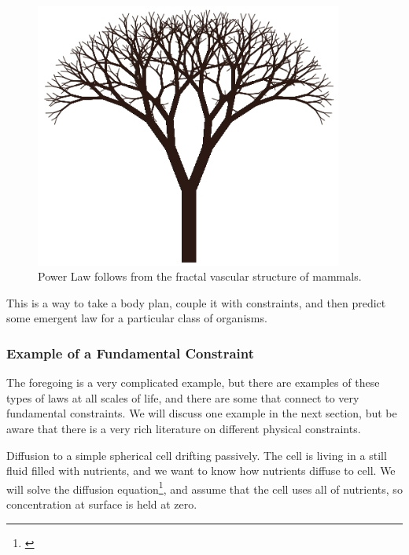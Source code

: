 \documentclass[]{article}
\begin{document}
\begin{figure}[H]
	\caption{Power Law follows from the fractal vascular structure of mammals.}\label{fig:FractalBranching}
	\includegraphics[width=0.9\textwidth]{FractalBranching}
\end{figure}

This is a  way to take a body plan, couple it with constraints, and then predict some emergent law for a particular class of organisms.

\subsubsection{Example of a Fundamental Constraint}

The foregoing is a very complicated example, but there are examples of these types of laws at all scales of life, and there are some that connect to very fundamental constraints. We will discuss one example in the next section, but be aware that there is a very rich literature on different physical constraints.

Diffusion to a simple spherical cell drifting passively. The cell is living in a still fluid filled with nutrients, and we want to know how nutrients diffuse to cell. We will solve the diffusion equation\footnote{\cite[Lecture 3.8: Systematics and Limits of Metabolic Rates]{sfi2020}}, and assume that the cell uses all of nutrients, so concentration at surface is held at zero.
\end{document}
